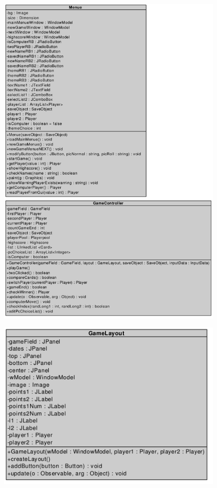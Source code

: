\begin{figure}[!h]
	\centering
    \includegraphics[width=\textwidth]{./Klassendiagramm2.png}
	\label{layout_gesamt}
\end{figure}

\begin{figure}[!t]
	\centering
    \includegraphics[width=\textwidth]{./Klassendiagramm3.png}
	\label{layout_gesamt}
\end{figure}







